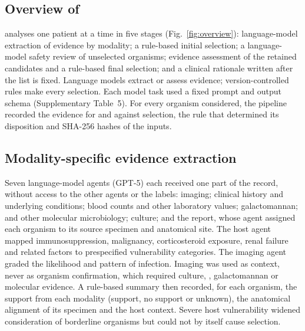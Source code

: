 \subsection*{Overview of \toolname}
\toolname analyses one patient at a time in five stages (Fig.~\ref{fig:overview}): language-model extraction of evidence by modality; a rule-based initial selection; a language-model safety review of unselected organisms; evidence assessment of the retained candidates and a rule-based final selection; and a clinical rationale written after the list is fixed. Language models extract or assess evidence; version-controlled rules make every selection. Each model task used a fixed prompt and output schema (Supplementary Table~5). For every organism considered, the pipeline recorded the evidence for and against selection, the rule that determined its disposition and SHA-256 hashes of the inputs.

\subsection*{Modality-specific evidence extraction}
Seven language-model agents (GPT-5) each received one part of the record, without access to the other agents or the labels: imaging; clinical history and underlying conditions; blood counts and other laboratory values; galactomannan; \filmarray and other molecular microbiology; culture; and the \mngs report, whose agent assigned each organism to its source specimen and anatomical site. The host agent mapped immunosuppression, malignancy, corticosteroid exposure, renal failure and related factors to prespecified vulnerability categories. The imaging agent graded the likelihood and pattern of infection. Imaging was used as context, never as organism confirmation, which required culture, \filmarray, galactomannan or molecular evidence. A rule-based summary then recorded, for each organism, the support from each modality (support, no support or unknown), the anatomical alignment of its specimen and the host context. Severe host vulnerability widened consideration of borderline organisms but could not by itself cause selection.

